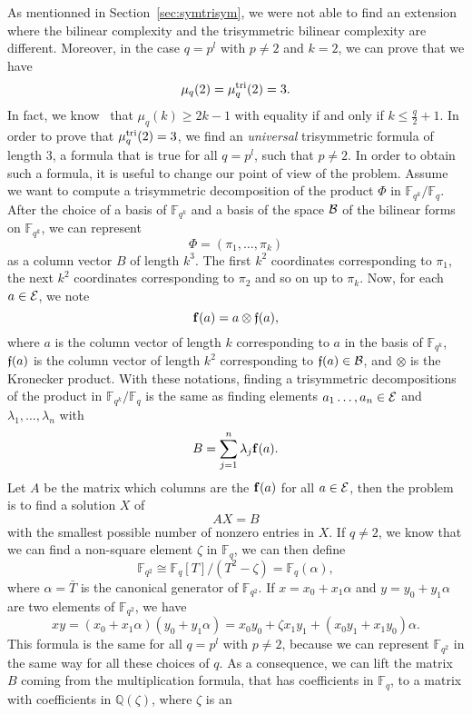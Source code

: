 \documentclass[11pt]{article}
\begin{document}
As mentionned in Section~\ref{sec:symtrisym}, we were not able to find an
extension where the bilinear complexity and the trisymmetric bilinear
complexity are different. Moreover, in the case $q=p^l$ with $p\neq2$ and $k=2$,
we can prove that we have
\[
  \mu_q(2) = \mu_{q}^{\text{tri}}(2) = 3.
\]
In fact, we know~\cite[Theorem 2.2]{BCPRRR19} that $\mu_q(k)\geq2k-1$ with
equality if and only if $k\leq \frac{q}{2}+1$. In order to prove that
$\mu_{q}^{\text{tri}}(2) = 3$, we find an \emph{universal} trisymmetric formula of length
$3$, \ie a formula that is true for all
$q=p^l$, such that $p\neq2$. In order to obtain such a formula, it is useful to change our point of
view of the problem. Assume we want to compute a trisymmetric decomposition of
the product $\Phi$ in $\mathbb{F}_{q^k}/\mathbb{F}_q$. After the choice of a basis of
$\mathbb{F}_{q^k}$ and a basis of the space $\mathcal{B}$ of the bilinear forms on
$\mathbb{F}_{q^k}$, we can represent
\[
  \Phi=(\pi_1, \dots, \pi_k)
\]
as a column vector $B$ of length $k^3$. The first $k^2$ coordinates corresponding
to $\pi_1$, the next $k^2$ coordinates corresponding to $\pi_2$ and so on up to
$\pi_k$. Now, for each $a\in\mathcal{E}$, we note
\[
  \mathbf{f}(a) = a\otimes \mathfrak{f}(a),
\] 
where $a$ is the column vector of length $k$ corresponding to $a$ in the basis
of $\mathbb{F}_{q^k}$, $\mathfrak{f}(a)$ is the column vector of length $k^2$ corresponding
to $\mathfrak{f}(a)\in\mathcal{B}$, and $\otimes$ is the Kronecker product. With these notations,
finding a trisymmetric decompositions of the product in
$\mathbb{F}_{q^k}/\mathbb{F}_{q}$ is the same as finding elements $a_1\dots,
a_n\in\mathcal{E}$ and $\lambda_1, \dots, \lambda_n$ with
\[
  B = \sum_{j=1}^n \lambda_j\mathbf{f}(a).
\]
Let $A$ be the matrix which columns are the $\mathbf{f}(a)$ for all $a\in\mathcal{E}$, then the
problem is to find a solution $X$ of
\[
  AX = B
\]
with the smallest possible number of nonzero entries in $X$. If $q\neq2$, we
know that we can find a non-square element $\zeta$ in $\mathbb{F}_q$, we can then define
\[
  \mathbb{F}_{q^2}\cong\mathbb{F}_q[T]/(T^2-\zeta)=\mathbb{F}_{q}(\alpha),
\]
where $\alpha=\bar T$ is the canonical generator of $\mathbb{F}_{q^2}$. If $x =
x_0 + x_1\alpha$ and $y = y_0 + y_1\alpha$ are two elements of
$\mathbb{F}_{q^2}$, we have
\[
  xy = (x_0+x_1\alpha)(y_0+y_1\alpha)=x_0y_0+\zeta x_1y_1
  +(x_0y_1+x_1y_0)\alpha.
\]
This formula is the same for all $q=p^l$ with $p\neq2$, because we can represent
$\mathbb{F}_{q^2}$ in the same way for all these choices of $q$. As a consequence, we can lift the matrix $B$ coming from
the multiplication formula, that has coefficients in $\mathbb{F}_{q}$, to a
matrix with coefficients in $\mathbb{Q}(\zeta)$, where $\zeta$ is an
\end{document}
